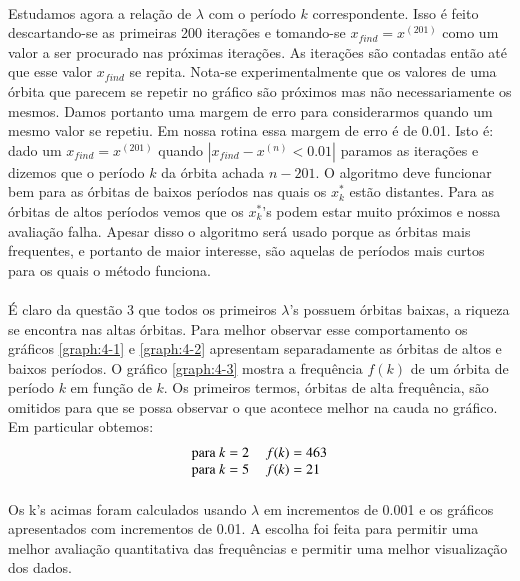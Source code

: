 \documentclass[a4paper,11pt]{article}
\begin{document}
\paragraph{}Estudamos agora a relação de $\lambda$ com o período $k$ correspondente. Isso é feito descartando-se as primeiras 200 iterações e tomando-se $x_{find} = x^{(201)}$ como um valor a ser procurado nas próximas iterações. As iterações são contadas então até que esse valor $x_{find}$ se repita. Nota-se experimentalmente que  os valores de uma órbita que parecem se repetir no gráfico são próximos mas não necessariamente os mesmos. Damos portanto uma margem de erro para considerarmos quando um mesmo valor se repetiu. Em nossa rotina essa margem de erro é de 0.01. Isto é: dado um $x_{find} = x^{(201)}$ quando $|x_{find} - x^{(n)} < 0.01|$ paramos as iterações e dizemos que o período $k$ da órbita achada $n -201$. O algoritmo deve funcionar bem para as órbitas de baixos períodos nas quais os $x_k^*$ estão distantes. Para as órbitas de altos períodos vemos que os $x_k^*$'s podem estar muito próximos e nossa avaliação falha. Apesar disso o algoritmo será usado porque as órbitas mais frequentes, e portanto de maior interesse, são aquelas de períodos mais curtos para os quais o método funciona.
\paragraph{} É claro da questão 3 que todos os primeiros $\lambda$'s possuem órbitas baixas, a riqueza se encontra nas altas órbitas. Para melhor observar esse comportamento os gráficos \ref{graph:4-1} e \ref{graph:4-2}  apresentam separadamente as órbitas de altos e baixos períodos. O gráfico \ref{graph:4-3} mostra a frequência $f(k)$ de um órbita de período $k$ em função de $k$. Os primeiros termos, órbitas de alta frequência, são omitidos para que se possa observar o que acontece melhor na cauda no gráfico. Em particular obtemos:
	\begin{displaymath}
		\begin{tabular}{ll}
			para $k = 2$ & $f(k) = 463$ \\
			para $k = 5$ & $f(k) = 21$ \\		
		\end{tabular}			
	\end{displaymath}
	
\paragraph{}Os k's acimas foram calculados usando $\lambda$ em incrementos de 0.001 e os gráficos apresentados com incrementos de 0.01. A escolha foi feita para permitir uma melhor avaliação quantitativa das frequências e permitir uma melhor visualização dos dados.
	\FloatBarrier	
	
\end{document}
